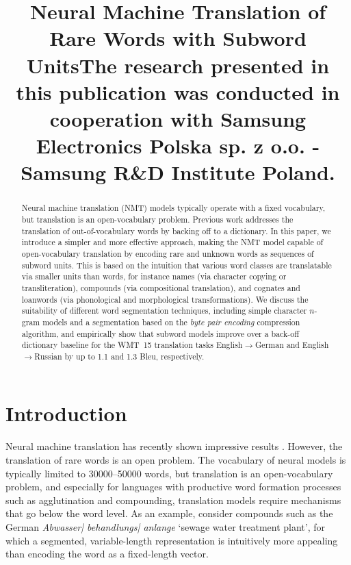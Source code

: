 \title{Neural Machine Translation of Rare Words with Subword UnitsThe research presented in this publication was conducted in cooperation with Samsung Electronics Polska sp. z o.o. - Samsung R&D Institute Poland.}

\begin{abstract}
Neural machine translation (NMT) models typically operate with a fixed vocabulary, but translation is an open-vocabulary problem. Previous work addresses the translation of out-of-vocabulary words by backing off to a dictionary. In this paper, we introduce a simpler and more effective approach, making the NMT model capable of open-vocabulary translation by encoding rare and unknown words as sequences of subword units. This is based on the intuition that various word classes are translatable via smaller units than words, for instance names (via character copying or transliteration), compounds (via compositional translation), and cognates and loanwords (via phonological and morphological transformations). We discuss the suitability of different word segmentation techniques, including simple character $n$-gram models and a segmentation based on the \emph{byte pair encoding} compression algorithm, and empirically show that subword models improve over a back-off dictionary baseline for the \mbox{WMT 15} translation tasks English$\to$German and English$\to$Russian by up to 1.1 and 1.3 {\sc Bleu}, respectively.
\end{abstract}

\section{Introduction}

Neural machine translation has recently shown impressive results \cite{kalchbrenner13emnlp,DBLP:conf/nips/SutskeverVL14,DBLP:journals/corr/BahdanauCB14}. However, the translation of rare words is an open problem. The vocabulary of neural models is typically limited to \num{30000}--\num{50000} words, but translation is an open-vocabulary problem, and especially for languages with productive word formation processes such as agglutination and compounding, translation models require mechanisms that go below the word level. As an example, consider compounds such as the German \emph{Abwasser{\color{gray}|} behandlungs{\color{gray}|} anlange} `sewage water treatment plant', for which a segmented, variable-length representation is intuitively more appealing than encoding the word as a fixed-length vector.

